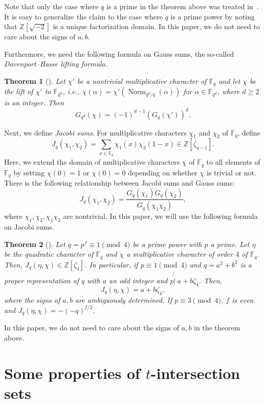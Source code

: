 \documentclass[10pt]{amsart}
\newtheorem{theo}{Theorem}[section]
\theoremstyle{definition}
\DeclareMathOperator{\Norm}{Norm}
\newcommand*\Z{{\mathbb Z}}
\newcommand*\F{{\mathbb F}}
\newcommand*{\notmid}{\mathbin{\not{|}\:}}
\begin{document}
Note that only the case where $q$ is a prime in the theorem above was treated in~\cite{Mv}. It is easy to generalize the claim to the case where $q$ is a prime power by noting that $\Z[\sqrt{-2}]$ is a unique factorization domain. In this paper, we do not need to care about the signs of $a,b$.

Furthermore, we need the following formula on Gauss sums, the so-called \emph{Davenport--Hasse lifting formula}.

\begin{theo}[{\cite[Theorem~11.5.2]{BEW97}}]\label{thm:lift}
Let $\chi'$ be a nontrivial multiplicative character of $\F_{q}$ and let $\chi$ be the lift of $\chi'$ to $\F_{q^{d}}$, i.e., $\chi(\alpha)=\chi'(\Norm_{q^{d}/q}(\alpha))$ for $\alpha\in \F_{q^{d}}$, where $d\geq 2$ is an integer. Then
\[
G_{q^d}(\chi)=(-1)^{d-1}(G_{q}(\chi'))^d.
\]
\end{theo}

Next, we define \emph{Jacobi sums}. For multiplicative characters $\chi_1$ and $\chi_2$ of $\F_q$, define
\[
J_q(\chi_1,\chi_2)=\sum_{x\in \F_q}\chi_1(x)\chi_2(1-x) \in \Z[\zeta_{q-1}].
\]
Here, we extend the domain of multiplicative characters $\chi$ of $\F_q$ to all elements of $\F_q$ by setting $\chi(0)=1$ or $\chi(0)=0$ depending on whether $\chi$ is trivial or not. There is the following relationship between Jacobi sums and Gauss sums:
\begin{equation}\label{eq:Gaussrelation}
J_q(\chi_1,\chi_2)=\frac{G_q(\chi_1)G_q(\chi_2)}{G_q(\chi_1\chi_2)},
\end{equation}
where $\chi_1,\chi_2,\chi_1\chi_2$ are nontrivial. In this paper, we will use the following formula on Jacobi sums.

\begin{theo}[\cite{St}]\label{lem:facto}
Let $q=p^f\equiv 1\pmod{4}$ be a prime power with $p$ a prime. Let $\eta$ be the quadratic character of $\F_q$ and $\chi$ a multiplicative character of order $4$ of $\F_q$. Then, $J_q(\eta,\chi)\in \Z[\zeta_4]$. In particular, if $p\equiv 1\pmod{4}$ and $q=a^2+b^2$ is a proper representation of $q$ with $a$ an odd integer and $p\notmid a+b\zeta_4$. Then,
\[
J_q(\eta,\chi)=a+b\zeta_4,
\]
where the signs of $a,b$ are ambiguously determined. If $p\equiv 3\pmod{4}$, $f$ is even and $J_q(\eta,\chi)=-(-q)^{f/2}$.
\end{theo}

In this paper, we do not need to care about the signs of $a,b$ in the theorem above.


\section{Some properties of \texorpdfstring{$t$}{t}-intersection sets}\label{sec:comp}
\end{document}

